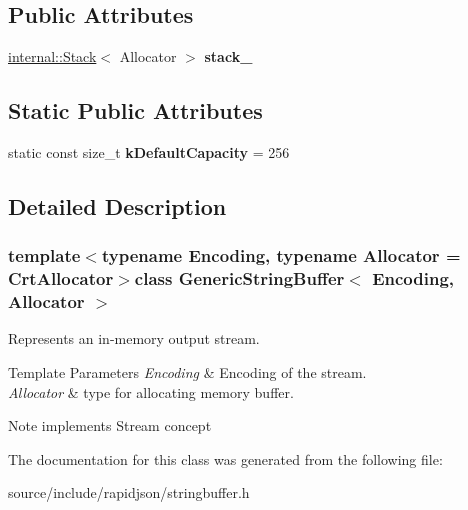 \subsection*{Public Attributes}
\begin{DoxyCompactItemize}
\item 
\hypertarget{class_generic_string_buffer_aaef716643febb9de5957dbf8ff904409}{}\hyperlink{classinternal_1_1_stack}{internal\+::\+Stack}$<$ Allocator $>$ {\bfseries stack\+\_\+}\label{class_generic_string_buffer_aaef716643febb9de5957dbf8ff904409}

\end{DoxyCompactItemize}
\subsection*{Static Public Attributes}
\begin{DoxyCompactItemize}
\item 
\hypertarget{class_generic_string_buffer_ae74f9df854dd5a7db4315ef44b016d22}{}static const size\+\_\+t {\bfseries k\+Default\+Capacity} = 256\label{class_generic_string_buffer_ae74f9df854dd5a7db4315ef44b016d22}

\end{DoxyCompactItemize}


\subsection{Detailed Description}
\subsubsection*{template$<$typename Encoding, typename Allocator = Crt\+Allocator$>$class Generic\+String\+Buffer$<$ Encoding, Allocator $>$}

Represents an in-\/memory output stream. 


\begin{DoxyTemplParams}{Template Parameters}
{\em Encoding} & Encoding of the stream. \\
\hline
{\em Allocator} & type for allocating memory buffer. \\
\hline
\end{DoxyTemplParams}
\begin{DoxyNote}{Note}
implements Stream concept 
\end{DoxyNote}


The documentation for this class was generated from the following file\+:\begin{DoxyCompactItemize}
\item 
source/include/rapidjson/stringbuffer.\+h\end{DoxyCompactItemize}
